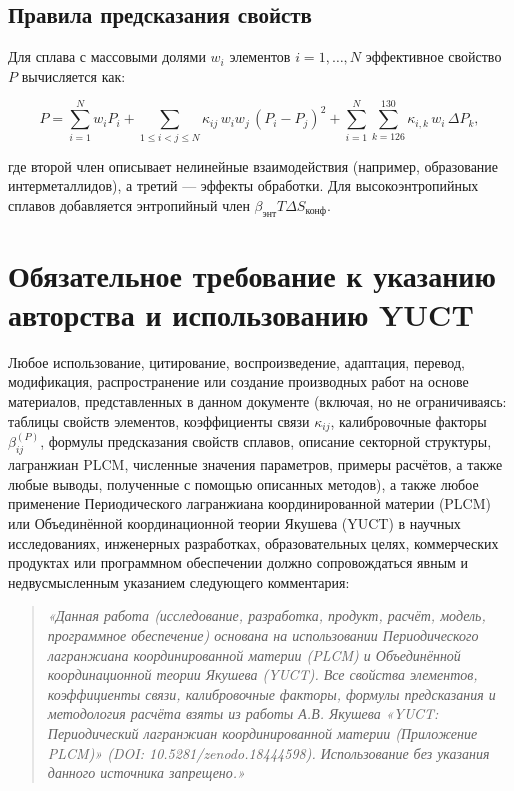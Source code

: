 \documentclass[12pt,a4paper]{article}
\begin{document}
	\subsection{Правила предсказания свойств}
	
	Для сплава с массовыми долями \(w_i\) элементов \(i=1,\dots,N\) эффективное свойство \(P\) вычисляется как:
	
	\[
	P = \sum_{i=1}^{N} w_i P_i
	+ \sum_{1\le i<j\le N} \kappa_{ij}\, w_i w_j\, (P_i - P_j)^2
	+ \sum_{i=1}^{N} \sum_{k=126}^{130} \kappa_{i,k}\, w_i\, \Delta P_k,
	\]
	
	где второй член описывает нелинейные взаимодействия (например, образование интерметаллидов), а третий — эффекты обработки. Для высокоэнтропийных сплавов добавляется энтропийный член \(\beta_{\text{энт}} T \Delta S_{\text{конф}}\).
	
	\section*{Обязательное требование к указанию авторства и использованию YUCT}
	
	Любое использование, цитирование, воспроизведение, адаптация, перевод, модификация, распространение или создание производных работ на основе материалов, представленных в данном документе (включая, но не ограничиваясь: таблицы свойств элементов, коэффициенты связи \(\kappa_{ij}\), калибровочные факторы \(\beta_{ij}^{(P)}\), формулы предсказания свойств сплавов, описание секторной структуры, лагранжиан PLCM, численные значения параметров, примеры расчётов, а также любые выводы, полученные с помощью описанных методов), а также любое применение Периодического лагранжиана координированной материи (PLCM) или Объединённой координационной теории Якушева (YUCT) в научных исследованиях, инженерных разработках, образовательных целях, коммерческих продуктах или программном обеспечении должно сопровождаться явным и недвусмысленным указанием следующего комментария:
	
	\begin{quote}
		\emph{«Данная работа (исследование, разработка, продукт, расчёт, модель, программное обеспечение) основана на использовании Периодического лагранжиана координированной материи (PLCM) и Объединённой координационной теории Якушева (YUCT). Все свойства элементов, коэффициенты связи, калибровочные факторы, формулы предсказания и методология расчёта взяты из работы А.В. Якушева «YUCT: Периодический лагранжиан координированной материи (Приложение PLCM)» (DOI: 10.5281/zenodo.18444598). Использование без указания данного источника запрещено.»}
	\end{quote}
	
\end{document}
